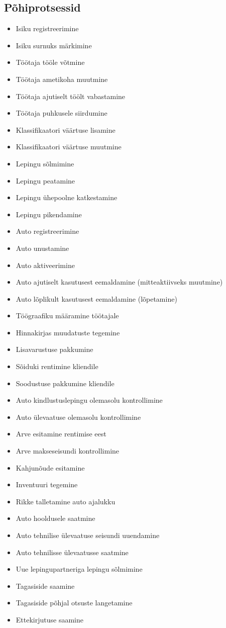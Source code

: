 \documentclass{report}
\begin{document}
\subsection{Põhiprotsessid}
\begin{itemize}
	\item Isiku registreerimine
	\item Isiku surnuks märkimine
	\item Töötaja tööle võtmine
	\item Töötaja ametikoha muutmine
	\item Töötaja ajutiselt töölt vabastamine
	\item Töötaja puhkusele siirdumine
	\item Klassifikaatori väärtuse lisamine
	\item Klassifikaatori väärtuse muutmine
	\item Lepingu sõlmimine
	\item Lepingu peatamine
	\item Lepingu ühepoolne katkestamine
	\item Lepingu pikendamine
	\item Auto registreerimine
	\item Auto unustamine
	\item Auto aktiveerimine
	\item Auto ajutiselt kasutusest eemaldamine (mitteaktiivseks muutmine)
	\item Auto lõplikult kasutusest eemaldamine (lõpetamine)
	\item Töögraafiku määramine töötajale
	\item Hinnakirjas muudatuste tegemine
	\item Lisavarustuse pakkumine 
	\item Sõiduki rentimine kliendile
	\item Soodustuse pakkumine kliendile
	\item Auto kindlustuslepingu olemasolu kontrollimine
	\item Auto ülevaatuse olemasolu kontrollimine
	\item Arve esitamine rentimise eest
	\item Arve makseseisundi kontrollimine
	\item Kahjunõude esitamine
	\item Inventuuri tegemine
	\item Rikke talletamine auto ajalukku
	\item Auto hooldusele saatmine
	\item Auto tehnilise ülevaatuse seisundi uuendamine
	\item Auto tehnilisse ülevaatusse saatmine
	\item Uue lepingupartneriga lepingu sõlmimine
	\item Tagasiside saamine
	\item Tagasiside põhjal otsuste langetamine
	\item Ettekirjutuse saamine
\end{itemize}
 
\end{document}
